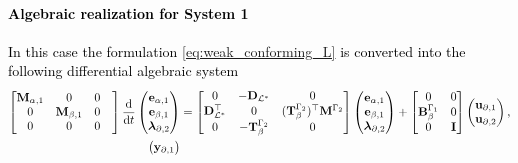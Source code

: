 \documentclass[11pt,a4paper]{article}
\newcommand{\revone}[1]{{\textcolor{black}{#1}}}
\begin{document}
\revone{
\paragraph{Algebraic realization for System 1}
In this case the formulation \eqref{eq:weak_conforming_L} is converted into the following differential algebraic system
\begin{equation}
    \begin{aligned}
        \begin{bmatrix}
            \mathbf{M}_{\alpha, 1} & 0 & 0\\
            0 & \mathbf{M}_{\beta, 1} & 0 & \\
            0 & 0 & 0
        \end{bmatrix}
        \odv{}{t}
        \begin{pmatrix}
            \mathbf{e}_{\alpha, 1} \\
            \mathbf{e}_{\beta, 1} \\
            \bm{\lambda}_{\partial, 2}
        \end{pmatrix} &= 
        \begin{bmatrix}
            0 & -\mathbf{D}_{\mathcal{L}^*} & 0 \\
             \mathbf{D}_{\mathcal{L}^*}^\top & 0 & (\mathbf{T}_\beta^{\Gamma_2})^\top \mathbf{M}^{\Gamma_2} \\
             0 & -\mathbf{T}_{\beta}^{\Gamma_2} & 0 
        \end{bmatrix}
        \begin{pmatrix}
            \mathbf{e}_{\alpha, 1} \\
            \mathbf{e}_{\beta, 1} \\
            \bm{\lambda}_{\partial, 2}            
        \end{pmatrix} + 
        \begin{bmatrix}
            0 & 0 \\
            \mathbf{B}_\beta^{\Gamma_1} & 0 \\
            0 & \mathbf{I}
        \end{bmatrix} 
        \begin{pmatrix}
            \mathbf{u}_{\partial, 1} \\
            \mathbf{u}_{\partial, 2}
        \end{pmatrix}, \\
        \begin{pmatrix}
            \mathbf{y}_{\partial, 1} \\

\end{pmatrix}
\end{aligned}
\end{equation}}
\end{document}
